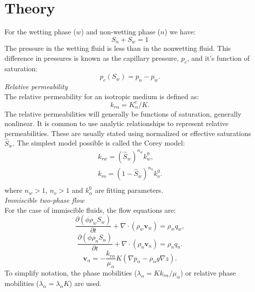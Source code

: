 \documentclass[a4paper,10pt]{report}
\title{}
\author{}
\begin{document}
\section*{Theory}
For the wetting phase ($w$) and non-wetting phase ($n$) we have:
\begin{equation}\label{eq:satrel}
 S_n+S_w=1
\end{equation}
The pressure in the wetting fluid is less than in the nonwetting fluid. 
This difference in pressures is known as the capillary pressure, $p_c$, and it's function of saturation:
\begin{equation}\label{eq:cappress}
 p_c(S_w)=p_n-p_w.
\end{equation}
\emph{Relative permeability}\\
The relative permeability for an isotropic medium is defined as:
$$k_{r\alpha}=K_{\alpha}^e/K.$$
The relative permeabilities will generally be functions of saturation, generally nonlinear.
It is common to use analytic relationships to represent relative permeabilities. These are usually stated using normalized or effective saturations $\hat{S}_w.$ The simplest model possible is called the Corey model:
\begin{equation}\label{eq:Corey}
\begin{aligned}
k_{rw}=(\hat{S}_w)^{n_w}k_w^0,\\
k_{ro}=(1-\hat{S}_w)^{n_n}k_o^0.\\
\end{aligned}
\end{equation}
where $n_w>1$, $n_o>1$ and $k_{\alpha}^0$ are fitting parameters.\\
\emph{Immiscible two-phase flow}\\
For the case of immiscible fluids, the flow equations are:
\begin{equation}\label{we}
 \frac{\partial(\phi \rho_{w}S_{w})}{\partial t}+\nabla \cdot ( \rho_{w} \mathbf{v}_{w})=\rho_{w} q_{w},
\end{equation}
\begin{equation}\label{ne}
 \frac{\partial(\phi \rho_{n}S_{n})}{\partial t}+\nabla \cdot ( \rho_{n} \mathbf{v}_{n})=\rho_{n} q_{n}.
\end{equation}
\begin{equation*}
\mathbf{v}_{\alpha}=-\frac{k_{r\alpha}}{\mu_{\alpha}} {K}(\nabla p_{\alpha}-\rho_{\alpha} g \nabla z).
\end{equation*}
To simplify notation, the phase mobilities ($\lambda_{\alpha}=Kk_{r\alpha}/\mu_{\alpha}$) or relative phase mobilities ($\lambda_{\alpha}=\lambda_{\alpha}K$) are used. \\
\end{document}
